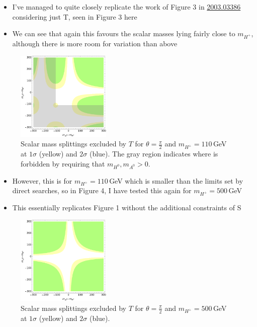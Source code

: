 \documentclass[11pt]{article}
\begin{document}
\newpage
\begin{itemize}
    \item I've managed to quite closely replicate the work of Figure 3 in \href{https://arxiv.org/pdf/2003.03386.pdf}{2003.03386} considering just T, seen in Figure 3 here
    \item We can see that again this favours the scalar masses lying fairly close to $m_{H^+}$, although there is more room for variation than above
\end{itemize}
\begin{figure}[ht]
    \centering
    \includegraphics[width=0.4\textwidth]{obliqueT.png}
    \caption{Scalar mass splittings excluded by $T$ for $\theta=\frac{\pi}{2}$ and $m_{H^+}=110\,$GeV at $1\sigma$ (yellow) and $2\sigma$ (blue). The gray region indicates where is forbidden by requiring that $m_{H^0},m_{A^0}>0$.}
\end{figure}
\begin{itemize}
    \item However, this is for $m_{H^+}=110\,$GeV which is smaller than the limits set by direct searches, so in Figure 4, I have tested this again for $m_{H^+}=500\,$GeV
    \item This essentially replicates Figure 1 without the additional constraints of S
\end{itemize}
\begin{figure}[ht]
    \centering
    \includegraphics[width=0.4\textwidth]{obliqueT2.png}
    \caption{Scalar mass splittings excluded by $T$ for $\theta=\frac{\pi}{2}$ and $m_{H^+}=500\,$GeV at $1\sigma$ (yellow) and $2\sigma$ (blue).}
\end{figure}
\end{document}

